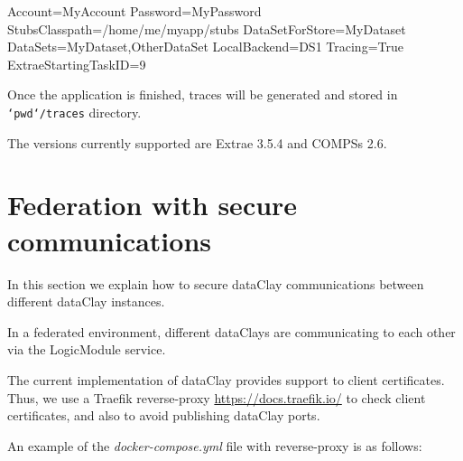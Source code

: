\begin{tBox}
 \begin{bash}
  Account=MyAccount
  Password=MyPassword
  StubsClasspath=/home/me/myapp/stubs
  DataSetForStore=MyDataset
  DataSets=MyDataset,OtherDataSet
  LocalBackend=DS1
  Tracing=True
  ExtraeStartingTaskID=9
 \end{bash}
\end{tBox}

Once the application is finished, traces will be generated and stored in \texttt{`pwd`/traces} directory. 

The versions currently supported are Extrae 3.5.4 and COMPSs 2.6.

\section{Federation with secure communications}

In this section we explain how to secure dataClay communications between different dataClay instances.

In a federated environment, different dataClays are communicating to each other via the LogicModule service. 

The current implementation of dataClay provides support to client certificates. Thus, we use a Traefik reverse-proxy \href {https://docs.traefik.io/} {https://docs.traefik.io/} to check client certificates, and also to avoid publishing dataClay ports. 

An example of the \textit{docker-compose.yml} file with reverse-proxy is as follows:

